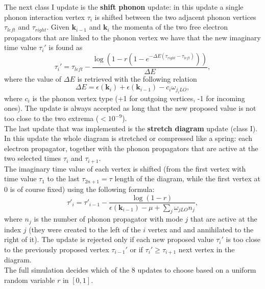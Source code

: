 The next class I update is the \textbf{shift phonon} update: in this update a single phonon interaction vertex $\tau_i$ is shifted between 
the two adjacent phonon vertices $\tau_{left}$ and $\tau_{right}$. Given $\mathbf{k}_{i-1}$ and $\mathbf{k}_i$ the momenta of the two free electron propagators 
that are linked to the phonon vertex we have that the new imaginary time value $\tau_i'$ is found as
\begin{equation}
    \tau_i'=\tau_{left}-\frac{\log{(1-r(1-e^{-\Delta E(\tau_{right}-\tau_{left})}))}}{\Delta E},
\end{equation}
where the value of $\Delta E$ is retrieved with the following relation
\begin{equation}
    \Delta E =\epsilon(\mathbf{k}_{i})+\epsilon(\mathbf{k}_{i-1})-c_i\omega_{j_iLO},
\end{equation}
where $c_i$ is the phonon vertex type (+1 for outgoing vertices, -1 for incoming ones). The update is always accepted as long that the new proposed value 
is not too close to the two extrema ($<10^{-9}$).\\
The last update that was implemented is the \textbf{stretch diagram} update (class I). In this update the whole diagram is stretched or compressed
like a spring: each electron propagator, together with the phonon propagators that are active at the two selected times $\tau_i$ and $\tau_{i+1}$.\\
The imaginary time value of each vertex is shifted (from the first vertex with time value $\tau_1$ to the last $\tau_{2n+1}=\tau$ length of the diagram, while the first vertex at 0 is of course fixed) 
using the following formula:
\begin{equation}
    \tau'_i=\tau'_{i-1}-\frac{\log{(1-r)}}{\epsilon(\mathbf{k}_{i-1})-\mu+\sum_j\omega_{jLO}n_j},
\end{equation}
where $n_j$ is the number of phonon propagator with mode $j$ that are active at the index $j$ (they were created to the left of the 
$i$ vertex and and annihilated to the right of it). The update is rejected only if each new proposed value $\tau_i'$ is too close to the previously proposed 
vertex $\tau_{i-1}'$ or if $\tau_i'\ge\tau_{i+1}$ next vertex in the diagram.\\
The full simulation decides which of the 8 updates to choose based on a uniform random variable $r$ in $[0,1]$.
